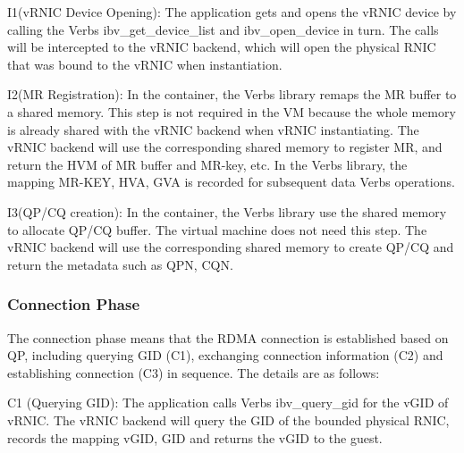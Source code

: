 I1(vRNIC Device Opening): The application gets and opens the vRNIC device by calling the Verbs ibv\_get\_device\_list and ibv\_open\_device in turn. The calls will be intercepted to the vRNIC backend, which will open the physical RNIC that was bound to the vRNIC when instantiation.

I2(MR Registration): In the container, the Verbs library remaps the MR buffer to a shared memory. This step is not required in the VM because the whole memory is already shared with the vRNIC backend when vRNIC instantiating. The vRNIC backend will use the corresponding shared memory to register MR, and return the HVM of MR buffer and MR-key, etc. In the Verbs library, the mapping {MR-KEY, HVA, GVA} is recorded for subsequent data Verbs operations.

I3(QP/CQ creation): In the container, the Verbs library use the shared memory to allocate QP/CQ buffer. The virtual machine does not need this step. The vRNIC backend will use the corresponding shared memory to create QP/CQ and return the metadata such as QPN, CQN.

\subsubsection{Connection Phase}
The connection phase means that the RDMA connection is established based on QP, including querying GID (C1), exchanging connection information (C2) and establishing connection (C3) in sequence. The details are as follows:

C1 (Querying GID): The application calls Verbs ibv\_query\_gid for the vGID of vRNIC. The vRNIC backend will query the GID of the bounded physical RNIC, records the mapping {vGID, GID} and returns the vGID to the guest.

